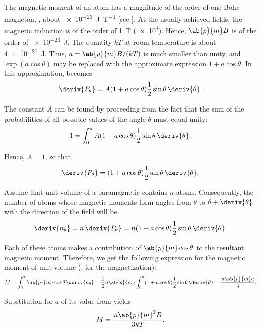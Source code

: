 The magnetic moment of an atom has a magnitude of the order of one Bohr magneton, \ie, about \SI{e-23}{\joule\per\tesla} [see ].
At the usually achieved fields, the magnetic induction is of the order of \SI{1}{\tesla} (\SI{e4}{\gauss}).
Hence, $\ab{p}{m}B$ is of the order of \SI{e-23}{\joule}.
The quantity $kT$ at room temperature is about \SI{4e-21}{\joule}.
Thus, $a=\ab{p}{m}B/(kT)$ is much smaller than unity, and $\exp(a\cos\theta)$ may be replaced with the approximate expression $1+a\cos\theta$.
In this approximation,  becomes
\begin{equation*}
    \deriv{P_{\theta}} = A (1+a\cos\theta) \frac{1}{2} \sin\theta\, \deriv{\theta}.
\end{equation*}

The constant $A$ can be found by proceeding from the fact that the sum of the probabilities of all possible values of the angle $\theta$ must equal unity:
\begin{equation*}
    1 = \int_0^{\pi} A (1+a\cos\theta) \frac{1}{2} \sin\theta\, \deriv{\theta}.
\end{equation*}

\noindent
Hence, $A=1$, so that
\begin{equation*}
    \deriv{P_{\theta}} = (1+a\cos\theta) \frac{1}{2} \sin\theta\, \deriv{\theta}.
\end{equation*}

Assume that unit volume of a paramagnetic contains $n$ atoms.
Consequently, the number of atoms whose magnetic moments form angles from $\theta$ to $\theta+\deriv{\theta}$ with the direction of the field will be
\begin{equation*}
    \deriv{n_{\theta}} = n\, \deriv{P_{\theta}} = n (1+a\cos\theta) \frac{1}{2} \sin\theta\, \deriv{\theta}.
\end{equation*}

\noindent
Each of these atoms makes a contribution of $\ab{p}{m}\cos\theta$ to the resultant magnetic moment.
Therefore, we get the following expression for the magnetic moment of unit volume (\ie, for the magnetization):
\begin{equation*}
    M = \int_0^{\pi} \ab{p}{m}\cos\theta\, \deriv{n_{\theta}} = \frac{1}{2} n\ab{p}{m} \int_0^{\pi} (1+a\cos\theta) \frac{1}{2} \sin\theta\, \deriv{\theta} = \frac{n\ab{p}{m}a}{3}.
\end{equation*}

\noindent
Substitution for $a$ of its value from  yields
\begin{equation*}
    M = \frac{n \ab{p}{m}^2 B}{3kT}.
\end{equation*}

